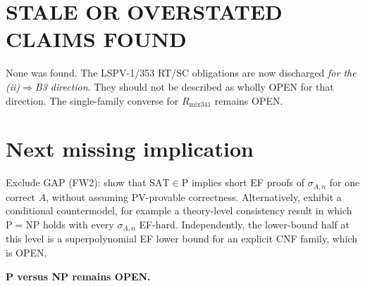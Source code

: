 \documentclass[11pt]{article}
\newcommand{\SAT}{\mathrm{SAT}}
\begin{document}
\section*{STALE OR OVERSTATED CLAIMS FOUND}
None was found. The LSPV-1/353 RT/SC obligations are now discharged \emph{for
the (ii)$\Rightarrow$B3 direction}. They should not be described as wholly OPEN
for that direction. The single-family converse for $R_{\mathrm{mix341}}$ remains
OPEN.

\section*{Next missing implication}
Exclude GAP (FW2): show that $\SAT\in\mathrm P$ implies short EF proofs of
$\sigma_{A,n}$ for one correct $A$, without assuming PV-provable correctness.
Alternatively, exhibit a conditional countermodel, for example a theory-level
consistency result in which $\mathrm P=\mathrm{NP}$ holds with every
$\sigma_{A,n}$ EF-hard. Independently, the lower-bound half at this level is a
superpolynomial EF lower bound for an explicit CNF family, which is OPEN.

\textbf{P versus NP remains OPEN.}
\end{document}
